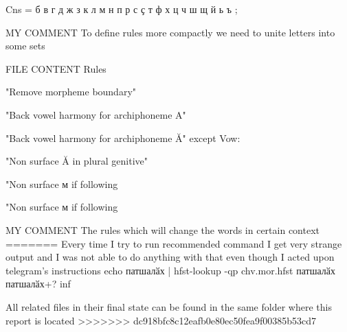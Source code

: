 \documentclass{article}
\begin{document}
Cns = б в г д ж з к л м н п р с ҫ т ф х ц ч ш щ й ь ъ ;

MY COMMENT
To define rules more compactly we need to unite letters into some sets 

FILE CONTENT  
Rules

"Remove morpheme boundary"
 
"Back vowel harmony for archiphoneme {A}"
 
"Back vowel harmony for archiphoneme {Ă}"
        except
                                     Vow: %
                                   
"Non surface {Ă} in plural genitive"
 
"Non surface {м} if following %

"Non surface {м} if following %

MY COMMENT
The rules which will change the words in certain context
=======
Every time I try to run recommended command I get very strange output and I was not able to do anything with that even though I acted upon telegram's instructions
echo патшалӑх | hfst-lookup -qp chv.mor.hfst
патшалӑх патшалӑх+? inf

All related files in their final state can be found in the same folder where this report is located
>>>>>>> dc918bfc8c12eafb0e80ec50fea9f00385b53cd7
\end{document}
